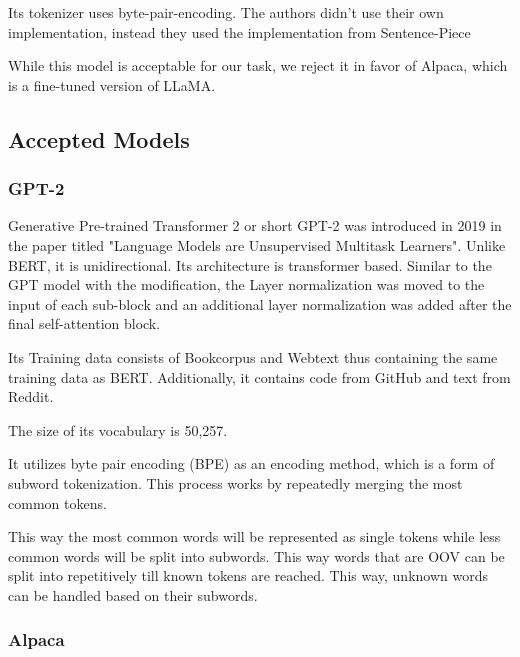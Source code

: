 Its tokenizer uses byte-pair-encoding\cite{touvron2023llama}. The authors didn't use their own implementation, instead they used the implementation from Sentence-Piece \cite{kudo2018sentencepiece}



While this model is acceptable for our task, we reject it in favor of Alpaca, which is a fine-tuned version of LLaMA.

\subsection{Accepted Models}

\subsubsection{GPT-2}

Generative Pre-trained Transformer 2 or short GPT-2 was introduced in 2019 in the paper titled "Language Models are Unsupervised Multitask Learners"\cite{Radford2019LanguageMA}. Unlike BERT, it is unidirectional. Its architecture is transformer based. Similar to the GPT model with the modification, the Layer normalization was moved to the input of each sub-block and an additional layer normalization was added after the final self-attention block\cite{Radford2019LanguageMA}.


Its Training data consists of Bookcorpus and Webtext thus containing the same training data as BERT. Additionally, it contains code from GitHub and text from Reddit.

The size of its vocabulary is 50,257\cite{Radford2019LanguageMA}.


It utilizes byte pair encoding (BPE) as an encoding method, which is a form of subword tokenization. This process works by repeatedly merging the most common tokens. 

This way the most common words will be represented as single tokens while less common words will be split into subwords. This way words that are OOV can be split into repetitively till known tokens are reached. This way, unknown words can be handled based on their subwords.



 



\subsubsection{Alpaca} 

